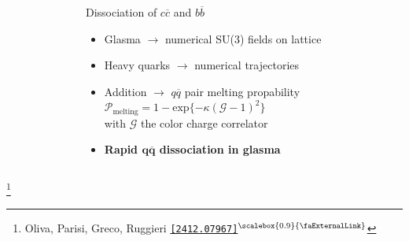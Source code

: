 \documentclass[aspectratio=169,11pt,usenames,dvipsnames]{beamer}
\renewcommand{\thefootnote}{\color{customblue}\faPaperPlaneO}
\newcommand\blfootnote[1]{%
  \begingroup
  \renewcommand\thefootnote{}\footnote{#1}%
  \addtocounter{footnote}{-1}%
  \endgroup
}
\begin{document}
\begin{frame}[t,noframenumbering]
\begin{columns}[onlytextwidth,t]
\begin{figure}
        \end{figure}
        \begin{center}
            {\Large\color{isgold} Dissociation of $c\overline{c}$ and $b\overline{b}$ \\[10pt]}
            \footnotesize
                \begin{itemize}
                    \item {\color{lightgray}Glasma $\rightarrow$ numerical SU($3$) fields on lattice}
                    \item {\color{lightgray}Heavy quarks $\rightarrow$ numerical trajectories}
                    \item {\color{lightgray}Addition $\rightarrow$ $q\overline{q}$ pair melting propability $\mathcal{P}_\mathrm{melting}=1-\mathrm{exp}\{-\kappa (\mathcal{G}-1)^2\}$ \\ with $\mathcal{G}$ the color charge correlator}\\[15pt]
                    \item {\color{destacado}\bfseries\normalsize{Rapid $\boldsymbol{q\overline{q}}$ dissociation in glasma}}
                \end{itemize}
        \end{center}
    \end{columns}
    \vspace{-30pt}
    \blfootnote{\scriptsize Oliva, Parisi, Greco, Ruggieri \href{https://arxiv.org/abs/2412.07967}{\color{palgold}\texttt{[2412.07967]}$^\text{\scalebox{0.9}{\faExternalLink}}$}}
\end{frame}
\end{document}
